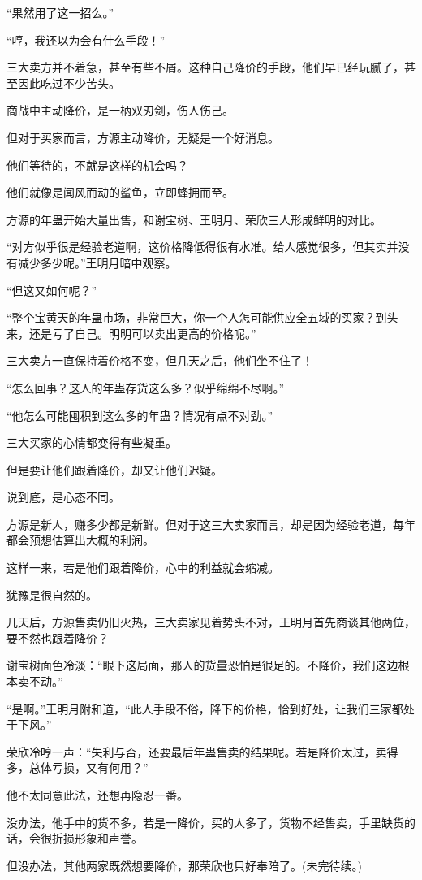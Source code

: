 \begin{this_body}
“果然用了这一招么。”

“哼，我还以为会有什么手段！”

三大卖方并不着急，甚至有些不屑。这种自己降价的手段，他们早已经玩腻了，甚至因此吃过不少苦头。

商战中主动降价，是一柄双刃剑，伤人伤己。

但对于买家而言，方源主动降价，无疑是一个好消息。

他们等待的，不就是这样的机会吗？

他们就像是闻风而动的鲨鱼，立即蜂拥而至。

方源的年蛊开始大量出售，和谢宝树、王明月、荣欣三人形成鲜明的对比。

“对方似乎很是经验老道啊，这价格降低得很有水准。给人感觉很多，但其实并没有减少多少呢。”王明月暗中观察。

“但这又如何呢？”

“整个宝黄天的年蛊市场，非常巨大，你一个人怎可能供应全五域的买家？到头来，还是亏了自己。明明可以卖出更高的价格呢。”

三大卖方一直保持着价格不变，但几天之后，他们坐不住了！

“怎么回事？这人的年蛊存货这么多？似乎绵绵不尽啊。”

“他怎么可能囤积到这么多的年蛊？情况有点不对劲。”

三大买家的心情都变得有些凝重。

但是要让他们跟着降价，却又让他们迟疑。

说到底，是心态不同。

方源是新人，赚多少都是新鲜。但对于这三大卖家而言，却是因为经验老道，每年都会预想估算出大概的利润。

这样一来，若是他们跟着降价，心中的利益就会缩减。

犹豫是很自然的。

几天后，方源售卖仍旧火热，三大卖家见着势头不对，王明月首先商谈其他两位，要不然也跟着降价？

谢宝树面色冷淡：“眼下这局面，那人的货量恐怕是很足的。不降价，我们这边根本卖不动。”

“是啊。”王明月附和道，“此人手段不俗，降下的价格，恰到好处，让我们三家都处于下风。”

荣欣冷哼一声：“失利与否，还要最后年蛊售卖的结果呢。若是降价太过，卖得多，总体亏损，又有何用？”

他不太同意此法，还想再隐忍一番。

没办法，他手中的货不多，若是一降价，买的人多了，货物不经售卖，手里缺货的话，会很折损形象和声誉。

但没办法，其他两家既然想要降价，那荣欣也只好奉陪了。(未完待续。)

\end{this_body}

